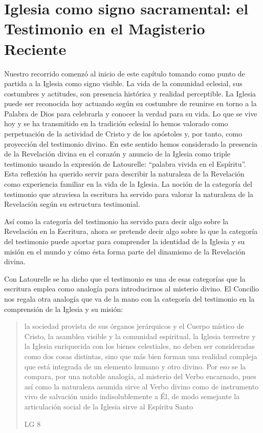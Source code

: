 \section{Iglesia como signo sacramental: el Testimonio en el Magisterio Reciente}

Nuestro recorrido comenzó al inicio de este capítulo tomando como punto de
partida a la Iglesia como signo visible. La vida de la comunidad eclesial, sus
costumbres y actitudes, son presencia histórica y realidad perceptible. La
Iglesia puede ser reconocida hoy actuando según su costumbre de reunirse en
torno a la Palabra de Dios para celebrarla y conocer la verdad para su vida. Lo
que se vive hoy y se ha transmitido en la tradición eclesial lo hemos valorado
como perpetuación de la actividad de Cristo y de los apóstoles y, por tanto,
como proyección del testimonio divino. En este sentido hemos considerado la
presencia de la Revelación divina en el corazón y anuncio de la Iglesia como
triple testimonio usando la expresión de Latourelle: \enquote{palabra vivida en
  el Espíritu}. Esta reflexión ha querido servir para describir la naturaleza de
la Revelación como experiencia familiar en la vida de la Iglesia. La noción de
la categoría del testimonio que atraviesa la escritura ha servido para valorar
la naturaleza de la Revelación según su estructura testimonial.

Así como la categoría del testimonio ha servido para decir algo sobre la
Revelación en la Escritura, ahora se pretende decir algo sobre lo que la
categoría del testimonio puede aportar para comprender la identidad de la
Iglesia y su misión en el mundo y cómo ésta forma parte del dinamismo de la
Revelación divina.

Con Latourelle se ha dicho que el testimonio es una de esas categorías que la
escritura emplea como analogía para introducirnos al misterio divino. El
Concilio nos regala otra analogía que va de la mano con la categoría del
testimonio en la comprensión de la Iglesia y su misión:
\blockquote[LG 8]{la sociedad provista de sus órganos jerárquicos y el Cuerpo
  místico de Cristo, la asamblea visible y la comunidad espiritual, la Iglesia
  terrestre y la Iglesia enriquecida con los bienes celestiales, no deben ser
  consideradas como dos cosas distintas, sino que más bien forman una realidad
  compleja que está integrada de un elemento humano y otro divino. Por eso se la
  compara, por una notable analogía, al misterio del Verbo encarnado, pues así
  como la naturaleza asumida sirve al Verbo divino como de instrumento vivo de
  salvación unido indisolublemente a Él, de modo semejante la articulación
  social de la Iglesia sirve al Espíritu Santo}

